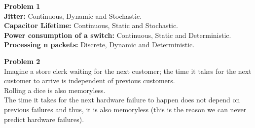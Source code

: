 \documentclass{article}
\newenvironment{problem}[2][Problem]
    { \begin{mdframed}[backgroundcolor=gray!20] \textbf{#1 #2} \\}
    {  \end{mdframed}}
\begin{document}
    \begin{problem}{1}
    	\textbf{Jitter:} Continuous, Dynamic and Stochastic.\\
    	\textbf{Capacitor Lifetime:} Continuous, Static and Stochastic.\\
    	\textbf{Power consumption of a switch:} Continuous, Static and Deterministic.\\
    	\textbf{Processing n packets:} Discrete, Dynamic and Deterministic.
    \end{problem}
    
    \begin{problem}{2}
    	Imagine a store clerk waiting for the next customer; the time it takes for the next customer 
    	to arrive is independent of previous customers.\\
    	Rolling a dice is also memoryless.\\
    	The time it takes for the next hardware failure to happen does not depend on 
    	previous failures and thus, it is also memoryless (this is the reason we can never predict
    	hardware failures).
    \end{problem}
\end{document}
